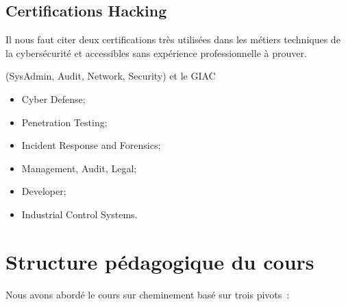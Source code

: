 \subsection{Certifications Hacking} 

Il nous faut citer deux certifications très utilisées dans les métiers techniques de la cybersécurité et accessibles sans expérience professionnelle à prouver.

 (SysAdmin, Audit, Network, Security) et le GIAC 

\begin{itemize}
  \item Cyber Defense;
  \item Penetration Testing;
  \item Incident Response and Forensics;
  \item Management, Audit, Legal;
  \item Developer;
  \item Industrial Control Systems.

\end{itemize}



\section {Structure pédagogique du cours}
Nous avons abordé le cours sur cheminement basé sur trois pivots :

